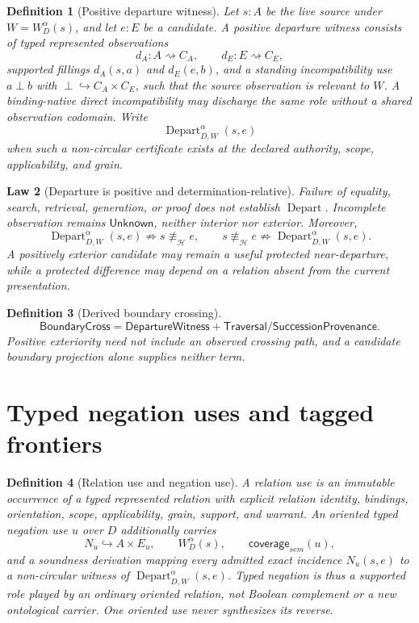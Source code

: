 \documentclass[11pt,oneside]{article}
\newtheorem{definition}{Definition}[section]
\newtheorem{law}[definition]{Law}
\newcommand{\Depart}{\operatorname{Depart}}
\newcommand{\eqH}{\equiv_{\mathcal H}}
\begin{document}
\begin{definition}[Positive departure witness]\label{def:departure-witness}
Let \(s:A\) be the live source under \(W=W_D^\alpha(s)\), and let \(e:E\) be a candidate.  A positive departure witness consists of typed represented observations
\[
d_A:A\rightsquigarrow C_A,
\qquad
d_E:E\rightsquigarrow C_E,
\]
supported fillings \(d_A(s,a)\) and \(d_E(e,b)\), and a standing incompatibility use \(a\perp b\) with \(\perp\hookrightarrow C_A\times C_E\), such that the source observation is relevant to \(W\).  A binding-native direct incompatibility may discharge the same role without a shared observation codomain.  Write
\[
\boxed{\Depart_{D,W}^{\alpha}(s,e)}
\]
when such a non-circular certificate exists at the declared authority, scope, applicability, and grain.
\end{definition}

\begin{law}[Departure is positive and determination-relative]\label{law:departure-relative}
Failure of equality, search, retrieval, generation, or proof does not establish \(\Depart\).  Incomplete observation remains \(\mathsf{Unknown}\), neither interior nor exterior.  Moreover,
\[
\Depart_{D,W}^{\alpha}(s,e)\not\Rightarrow s\not\eqH e,
\qquad
s\not\eqH e\not\Rightarrow\Depart_{D,W}^{\alpha}(s,e).
\]
A positively exterior candidate may remain a useful protected near-departure, while a protected difference may depend on a relation absent from the current presentation.
\end{law}

\begin{definition}[Derived boundary crossing]\label{def:boundary-crossing}
\[
\boxed{
\mathsf{BoundaryCross}
=
\mathsf{DepartureWitness}
+
\mathsf{Traversal/SuccessionProvenance}.
}
\]
Positive exteriority need not include an observed crossing path, and a candidate boundary projection alone supplies neither term.
\end{definition}

\section{Typed negation uses and tagged frontiers}

\begin{definition}[Relation use and negation use]\label{def:negation-use}
A relation use is an immutable occurrence of a typed represented relation with explicit relation identity, bindings, orientation, scope, applicability, grain, support, and warrant.  An oriented typed negation use \(u\) over \(D\) additionally carries
\[
N_u\hookrightarrow A\times E_u,
\qquad
W_D^\alpha(s),
\qquad
\mathsf{coverage}_{sem}(u),
\]
and a soundness derivation mapping every admitted exact incidence \(N_u(s,e)\) to a non-circular witness of \(\Depart_{D,W}^{\alpha}(s,e)\).  Typed negation is thus a supported role played by an ordinary oriented relation, not Boolean complement or a new ontological carrier.  One oriented use never synthesizes its reverse.
\end{definition}
\end{document}

